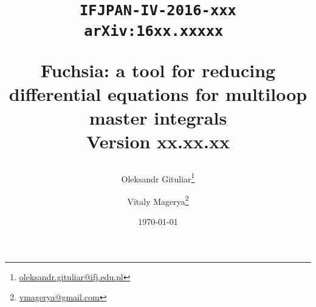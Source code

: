 \title{
  \begin{flushright}
  \tt\normalsize{IFJPAN-IV-2016-xxx}\\ 
  \tt\normalsize{arXiv:16xx.xxxxx} 
  \end{flushright}
  \vspace{1cm}
  \Large \bf Fuchsia: a tool for reducing differential equations for multiloop master integrals\\
  \vspace{0.5cm}
  \normalsize \bf Version xx.xx.xx
}

\author{Oleksandr Gituliar\thanks{\href{mailto:oleksandr.gituliar@ifj.edu.pl}{oleksandr.gituliar@ifj.edu.pl}}}

\author{Vitaly Magerya\thanks{\href{mailto:vmagerya@gmail.com}{vmagerya@gmail.com}}}
\affil{\ldots}

\date{\today}
